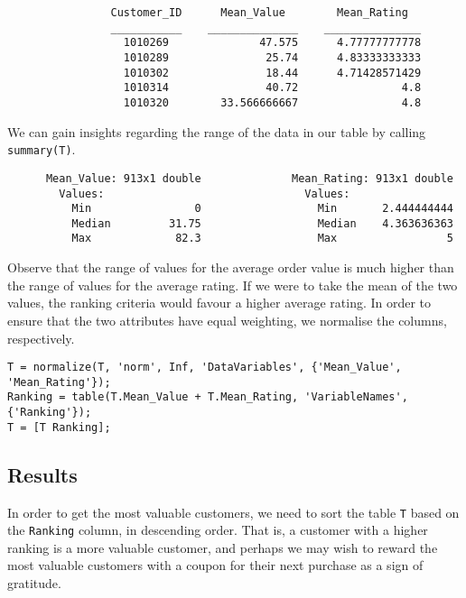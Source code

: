 \begin{lstlisting}
                Customer_ID      Mean_Value        Mean_Rating   
                ___________    ______________    _______________
                  1010269              47.575      4.77777777778
                  1010289               25.74      4.83333333333
                  1010302               18.44      4.71428571429
                  1010314               40.72                4.8
                  1010320        33.566666667                4.8  
\end{lstlisting}

\noindent
We can gain insights regarding the range of the data in our table by calling \lstinline|summary(T)|.

\begin{lstlisting}
      Mean_Value: 913x1 double              Mean_Rating: 913x1 double            
        Values:                               Values:            
          Min                0                  Min       2.444444444                
          Median         31.75                  Median    4.363636363                
          Max             82.3                  Max                 5    
\end{lstlisting}

\noindent
Observe that the range of values for the average order value is much higher than the range of values for the average rating. If we were to take the mean of the two values, the ranking criteria would favour a higher average rating. In order to ensure that the two attributes have equal weighting, we normalise the columns, respectively.

\begin{lstlisting}
T = normalize(T, 'norm', Inf, 'DataVariables', {'Mean_Value', 'Mean_Rating'});
Ranking = table(T.Mean_Value + T.Mean_Rating, 'VariableNames', {'Ranking'});
T = [T Ranking];
\end{lstlisting}

\subsection{Results}

In order to get the most valuable customers, we need to sort the table \lstinline|T| based on the \lstinline|Ranking| column, in descending order. That is, a customer with a higher ranking is a more valuable customer, and perhaps we may wish to reward the most valuable customers with a coupon for their next purchase as a sign of gratitude.

